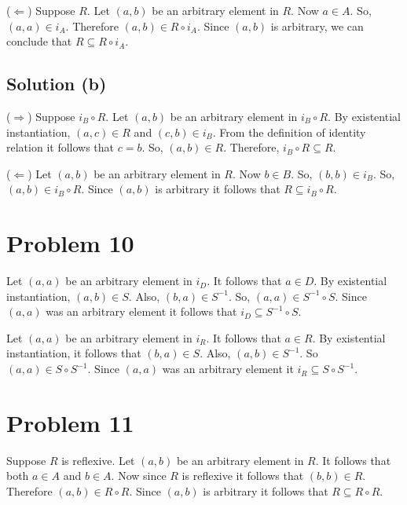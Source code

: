 \documentclass{article}
\begin{document}
($\Leftarrow$) Suppose $R$. Let $(a,b)$ be an arbitrary element in
$R$. Now $a \in A$. So, $(a,a) \in i_A$. Therefore $(a,b) \in R \circ
i_A$. Since $(a,b)$ is arbitrary, we can conclude that $R \subseteq R
\circ i_A$.

\subsection{Solution (b)}

($\Rightarrow$) Suppose $i_B \circ R$. Let $(a,b)$ be an arbitrary element in $i_B
\circ R$. By existential instantiation, $(a,c) \in R$ and $(c,b) \in
i_B$. From the definition of identity relation it follows that $c =
b$. So, $(a,b) \in R$. Therefore, $i_B \circ R \subseteq R$.

($\Leftarrow$) Let $(a,b)$ be an arbitrary element in $R$. Now $b \in
B$. So, $(b,b) \in i_B$. So, $(a,b) \in i_B \circ R$. Since $(a,b)$ is
arbitrary it follows that $R \subseteq i_B \circ R$.

\section{Problem 10}

Let $(a,a)$ be an arbitrary element in $i_D$. It follows that $a \in
D$. By existential instantiation, $(a,b) \in S$. Also, $(b,a) \in
S^{-1}$. So, $(a,a) \in S^{-1} \circ S$. Since $(a,a)$ was an
arbitrary element it follows that $i_D \subseteq S^{-1} \circ S$.

Let $(a,a)$ be an arbitrary element in $i_R$. It follows that $a \in
R$. By existential instantiation, it follows that $(b,a) \in S$. Also,
$(a,b) \in S^{-1}$. So $(a,a) \in S \circ S^{-1}$. Since $(a,a)$  was
an arbitrary element it $i_R \subseteq S \circ S^{-1}$.

\section{Problem 11}

Suppose $R$ is reflexive. Let $(a,b)$ be an arbitrary element in $R$.
It follows that both $a \in A$ and $b \in A$. Now since $R$ is
reflexive it follows that $(b,b) \in R$. Therefore $(a,b) \in R \circ
R$. Since $(a,b)$ is arbitrary it follows that $R \subseteq R \circ R$.
\end{document}
